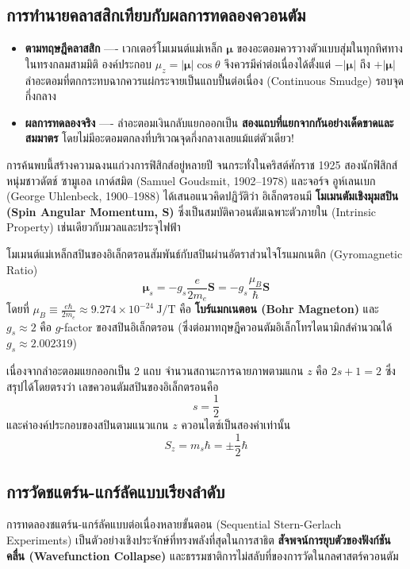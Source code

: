 \subsection{การทำนายคลาสสิกเทียบกับผลการทดลองควอนตัม}
\begin{itemize}
    \item \textbf{ตามทฤษฎีคลาสสิก} ---- เวกเตอร์โมเมนต์แม่เหล็ก $\boldsymbol{\mu}$ ของอะตอมควรวางตัวแบบสุ่มในทุกทิศทางในทรงกลมสามมิติ องค์ประกอบ $\mu_z = |\boldsymbol{\mu}|\cos\theta$ จึงควรมีค่าต่อเนื่องได้ตั้งแต่ $-|\boldsymbol{\mu}|$ ถึง $+|\boldsymbol{\mu}|$ ลำอะตอมที่ตกกระทบฉากควรแผ่กระจายเป็นแถบปื้นต่อเนื่อง (Continuous Smudge) รอบจุดกึ่งกลาง
    \item \textbf{ผลการทดลองจริง} ---- ลำอะตอมเงินกลับแยกออกเป็น \textbf{สองแถบที่แยกจากกันอย่างเด็ดขาดและสมมาตร} โดยไม่มีอะตอมตกลงที่บริเวณจุดกึ่งกลางเลยแม้แต่ตัวเดียว!
\end{itemize}

การค้นพบนี้สร้างความฉงนแก่วงการฟิสิกส์อยู่หลายปี จนกระทั่งในคริสต์ศักราช 1925 สองนักฟิสิกส์หนุ่มชาวดัตช์ ซามูเอล เกาด์สมิต (Samuel Goudsmit, 1902--1978) และจอร์จ อูห์เลนเบก (George Uhlenbeck, 1900--1988) ได้เสนอแนวคิดปฏิวัติว่า อิเล็กตรอนมี \textbf{โมเมนตัมเชิงมุมสปิน (Spin Angular Momentum, $\mathbf{S}$)} ซึ่งเป็นสมบัติควอนตัมเฉพาะตัวภายใน (Intrinsic Property) เช่นเดียวกับมวลและประจุไฟฟ้า

โมเมนต์แม่เหล็กสปินของอิเล็กตรอนสัมพันธ์กับสปินผ่านอัตราส่วนไจโรแมกเนติก (Gyromagnetic Ratio)
\begin{equation}
\boldsymbol{\mu}_s = -g_s \frac{e}{2m_e} \mathbf{S} = -g_s \frac{\mu_B}{\hbar} \mathbf{S}
\label{eq:spin_magnetic_moment}
\end{equation}
โดยที่ $\mu_B \equiv \frac{e\hbar}{2m_e} \approx 9.274 \times 10^{-24}~\text{J/T}$ คือ \textbf{โบร์แมกเนตอน (Bohr Magneton)} และ $g_s \approx 2$ คือ $g$-factor ของสปินอิเล็กตรอน (ซึ่งต่อมาทฤษฎีควอนตัมอิเล็กโทรไดนามิกส์คำนวณได้ $g_s \approx 2.002319$)

เนื่องจากลำอะตอมแยกออกเป็น 2 แถบ จำนวนสถานะการฉายภาพตามแกน $z$ คือ $2s + 1 = 2$ ซึ่งสรุปได้โดยตรงว่า เลขควอนตัมสปินของอิเล็กตรอนคือ
\begin{equation}
s = \frac{1}{2}
\end{equation}
และค่าองค์ประกอบของสปินตามแนวแกน $z$ ควอนไตซ์เป็นสองค่าเท่านั้น
\begin{equation}
S_z = m_s \hbar = \pm \frac{1}{2}\hbar
\end{equation}

\subsection{การวัดชแตร์น-แกร์ลัคแบบเรียงลำดับ}
การทดลองชแตร์น-แกร์ลัคแบบต่อเนื่องหลายขั้นตอน (Sequential Stern-Gerlach Experiments) เป็นตัวอย่างเชิงประจักษ์ที่ทรงพลังที่สุดในการสาธิต \textbf{สัจพจน์การยุบตัวของฟังก์ชันคลื่น (Wavefunction Collapse)} และธรรมชาติการไม่สลับที่ของการวัดในกลศาสตร์ควอนตัม

